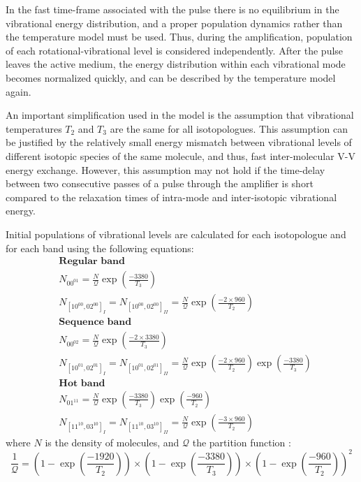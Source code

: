 \documentclass{report}
\begin{document}
In the fast time-frame associated with the pulse there is no equilibrium in the vibrational energy distribution, and a proper population dynamics rather than the temperature model must be used. Thus, during the amplification, population of each rotational-vibrational level is considered independently. After the pulse leaves the active medium, the energy distribution within each vibrational mode becomes normalized quickly, and can be described by the temperature model again.

An important simplification used in the model is the assumption that vibrational temperatures $T_2$ and $T_3$ are the same for all  isotopologues. This assumption can be justified by the relatively small energy mismatch between vibrational levels of different isotopic species of the same molecule, and thus, fast inter-molecular V-V energy exchange. However, this assumption may not hold if the time-delay between two consecutive passes of a pulse through the amplifier is short compared to the relaxation times of intra-mode and inter-isotopic vibrational energy.

Initial populations of vibrational levels are calculated for each isotopologue and for each band using the following equations:
\begin{equation}\label{eq:Boltzman}
\begin{aligned}
&\textbf{Regular band}\\
&N_{00^01}     =  \frac{N}{\mathcal{Q}}  \exp\left(\frac{-3380}{T_3}\right)\\
&N_{[10^00,02^00]_I}  = N_{[10^00,02^00]_{II}}  =  \frac{N}{\mathcal{Q}} \exp\left(\frac{-2\times 960}{T_2}\right)\\
&\textbf{Sequence band}\\
&N_{00^02}     =  \frac{N}{\mathcal{Q}}  \exp\left(\frac{-2\times 3380}{T_3}\right)\\
&N_{[10^01,02^01]_I}  =  N_{[10^01,02^01]_{II}} =  \frac{N}{\mathcal{Q}} \exp\left(\frac{-2\times 960}{T_2}\right) \exp\left(\frac{-3380}{T_3}\right)\\
&\textbf{Hot band}\\
&N_{01^11}     =  \frac{N}{\mathcal{Q}} \exp\left(\frac{-3380}{T_3}\right) \exp\left(\frac{-960}{T_2}\right)\\
&N_{[11^10,03^10]_I}  = N_{[11^10,03^10]_{II}} =   \frac{N}{\mathcal{Q}} \exp\left(\frac{-3\times 960}{T_2}\right)
\end{aligned}
\end{equation}
where $N$ is the density of  molecules, and $\mathcal{Q}$ the partition function \cite{Witteman-1987}:
\begin{equation}
\frac{1}{\mathcal{Q}} = \left(1-\exp\left(\frac{-1920}{T_2}\right)\right) \times \left(1-\exp\left(\frac{-3380}{T_3}\right)\right) \times \left(1-\exp\left(\frac{-960}{T_2}\right)\right)^2
\end{equation}
\end{document}
